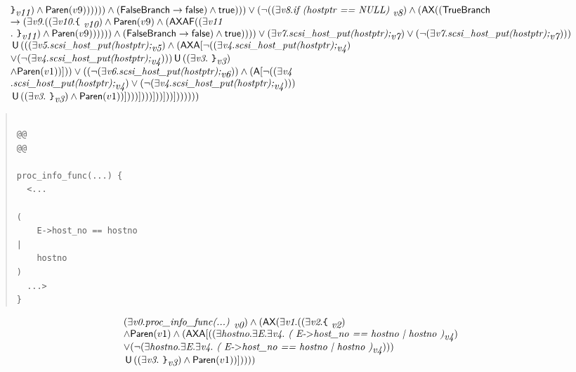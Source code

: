 \documentclass{article}
\newcommand{\U}{\,\mbox{\sf{U}}\,}
\newcommand{\A}{\mbox{\sf{A}}}
\newcommand{\AX}{\mbox{\sf{AX}}}
\newcommand{\AF}{\mbox{\sf{AF}}}
\newcommand{\mita}[1]{\mbox{\it{{#1}}}}
\newcommand{\msf}[1]{\mbox{\sf{{#1}}}}
\newcommand{\mth}[1]{\({#1}\)}
\newcommand{\ttlb}{\mbox{\tt \char'173}}
\newcommand{\ttrb}{\mbox{\tt \char'175}}
\begin{document}
\[\begin{array}{l}
{{\ttrb}}_{\mita{v11}}) \wedge \msf{Paren}(v9)))))) \wedge (\msf{FalseBranch} \rightarrow \msf{false}) \wedge \msf{true}))) \vee (\neg ((\exists \mita{v8} . \mita{if (hostptr == NULL) }_{\mita{v8}}) \wedge (\AX((\msf{TrueBranch}\\ \rightarrow (\exists \mita{v9} . ((\exists \mita{v10} . \mita{{\ttlb}
  }_{\mita{v10}}) \wedge \msf{Paren}(v9) \wedge (\AX\AF((\exists \mita{v11}\\ . \mita{
{\ttrb}}_{\mita{v11}}) \wedge \msf{Paren}(v9)))))) \wedge (\msf{FalseBranch} \rightarrow \msf{false}) \wedge \msf{true})))) \vee (\exists \mita{v7} . \mita{scsi\_host\_put(hostptr);}_{\mita{v7}}) \vee (\neg (\exists \mita{v7} . \mita{scsi\_host\_put(hostptr);}_{\mita{v7}})))\\ \U (((\exists \mita{v5} . \mita{scsi\_host\_put(hostptr);}_{\mita{v5}}) \wedge (\AX\A[\neg ((\exists \mita{v4} . \mita{scsi\_host\_put(hostptr);}_{\mita{v4}})\\ \vee (\neg (\exists \mita{v4} . \mita{scsi\_host\_put(hostptr);}_{\mita{v4}}))) \U ((\exists \mita{v3} . \mita{
{\ttrb}}_{\mita{v3}})\\ \wedge \msf{Paren}(v1))]
)) \vee ((\neg (\exists \mita{v6} . \mita{scsi\_host\_put(hostptr);}_{\mita{v6}})) \wedge (\A[\neg ((\exists \mita{v4}\\ . \mita{scsi\_host\_put(hostptr);}_{\mita{v4}}) \vee (\neg (\exists \mita{v4} . \mita{scsi\_host\_put(hostptr);}_{\mita{v4}})))\\ \U ((\exists \mita{v3} . \mita{
{\ttrb}}_{\mita{v3}}) \wedge \msf{Paren}(v1))]
)))]
)))]
))]
))]
))))))
\end{array}\]

\begin{quote}\begin{verbatim}

@@
@@

proc_info_func(...) {
  <...
    
(
    E->host_no == hostno
|
    hostno
)
  ...>
}
\end{verbatim}\end{quote}

\[\begin{array}{l}
(\exists \mita{v0} . \mita{proc\_info\_func(...) }_{\mita{v0}}) \wedge (\AX(\exists \mita{v1} . ((\exists \mita{v2} . \mita{{\ttlb}
  }_{\mita{v2}})\\ \wedge \msf{Paren}(v1) \wedge (\AX\A[((\exists \mita{hostno} . \exists \mita{E} . \exists \mita{v4} . \mita{
(
E-\mth{>}host\_no == hostno
|
hostno
)}_{\mita{v4}})\\ \vee (\neg (\exists \mita{hostno} . \exists \mita{E} . \exists \mita{v4} . \mita{
(
E-\mth{>}host\_no == hostno
|
hostno
)}_{\mita{v4}})))\\ \U ((\exists \mita{v3} . \mita{
{\ttrb}}_{\mita{v3}}) \wedge \msf{Paren}(v1))]
))))
\end{array}\]
\end{document}
